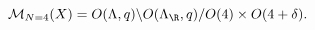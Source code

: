 \begin{equation}
\label{eq:MNfour}
  \mathcal{M}_{N=4}(X) = O(\Lambda,q) \backslash O(\Lambda_\R,q)/O(4) 
    \times O(4+\delta).
\end{equation}

